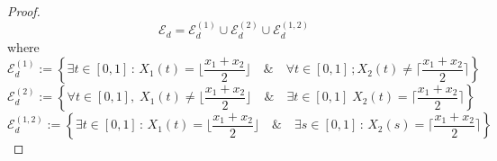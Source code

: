 \documentclass[a4paper,11pt,oneside,reqno]{amsart}
\theoremstyle{definition}
\numberwithin{equation}{section}
\begin{document}
\begin{proof}
{\color{black}
\begin{equation*}
	\mathcal{E}_{d}=\mathcal{E}_{d}^{(1)}\cup \mathcal{E}_{d}^{(2)}\cup \mathcal{E}_{d}^{(1,2)}
\end{equation*} 
where 
\begin{equation*}
	\mathcal{E}_{d}^{(1)}:= \left\{\exists t\in [0,1]\,:\, X_{1}(t)=\lfloor\frac{x_{1}+x_{2}}{2}\rfloor\quad \&\quad \forall t\in [0,1]\,; X_{2}(t)\neq \lceil \frac{x_{1}+x_{2}}{2}\rceil\right\}
\end{equation*}
\begin{equation*}
	\mathcal{E}_{d}^{(2)}:= \left\{\forall t\in [0,1],\; X_{1}(t)\neq \lfloor\frac{x_{1}+x_{2}}{2}\rfloor\quad \&\quad \exists t\in [0,1]\; X_{2}(t)= \lceil \frac{x_{1}+x_{2}}{2}\rceil\right\}
\end{equation*}
\begin{equation*}
	\mathcal{E}_{d}^{(1,2)}:= \left\{\exists t\in [0,1]\,:\, X_{1}(t)=\lfloor\frac{x_{1}+x_{2}}{2}\rfloor\quad \&\quad \exists  s\in [0,1]\,:\, X_{2}(s)= \lceil \frac{x_{1}+x_{2}}{2}\rceil\right\}
\end{equation*}
}


\end{proof}
\end{document}
